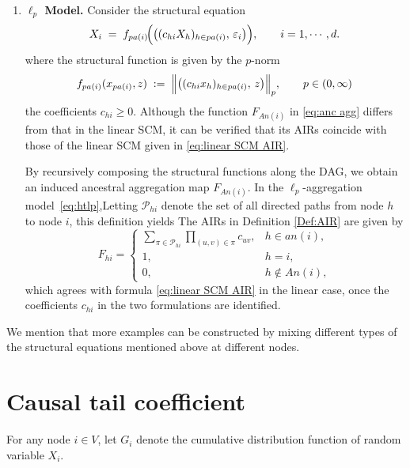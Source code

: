 \documentclass[10pt]{article}
\begin{document}
\begin{enumerate}
\item \textbf{$\ell_p$  Model.}
Consider the structural equation
\begin{equation}
    X_i
    \;=\;
    f_{{pa}(i)}\!\Bigl( \bigl( (c_{hi} X_h)_{h\in{pa}(i)},\, \varepsilon_i \bigr) \Bigr),
     \qquad i=1,\cdots,d.
    \label{eq:htlp}
\end{equation}
where the structural function is given by the $p$-norm
\[
f_{{pa}(i)}(x_{{pa}(i)}, z)
\;:=\;
\Bigl\| \bigl( (c_{hi} x_h)_{h\in{pa}(i)},\, z \bigr) \Bigr\|_p, \qquad p\in(0,\infty)
\]
the coefficients $c_{hi}\ge 0$. Although the function $F_{{An}(i)}$ in \eqref{eq:anc agg} differs from that in the linear SCM, it can be verified that its AIRs coincide with those of the linear SCM given in \eqref{eq:linear SCM AIR}.

 By recursively composing the structural functions along the DAG, we obtain an induced ancestral aggregation map $F_{{An}(i)}$. 
 In the $\ell_p$-aggregation model~\eqref{eq:htlp},Letting $\mathcal{P}_{hi}$ denote the set of all directed paths from node $h$ to node $i$, this definition yields
 The AIRs in Definition \ref{Def:AIR} are given by
 \[
 F_{hi}
 =
 \begin{cases}
 \sum_{\pi \in \mathcal{P}_{hi}} \prod_{(u,v) \in \pi} c_{uv}, & h \in {an}(i), \\[4pt]
         1, & h = i, \\[4pt]
         0, & h \notin {An}(i),
 \end{cases}
 \]
which agrees with formula \eqref{eq:linear SCM AIR} in the linear case, once the coefficients \(c_{hi}\) in the two formulations are identified.




\end{enumerate}




We mention that more examples can be constructed by mixing different types of the  structural equations mentioned above at different nodes.





\section{Causal tail coefficient}
For any node $i \in V$, let $G_i$ denote the cumulative distribution function of random variable $X_i$.
\end{document}
